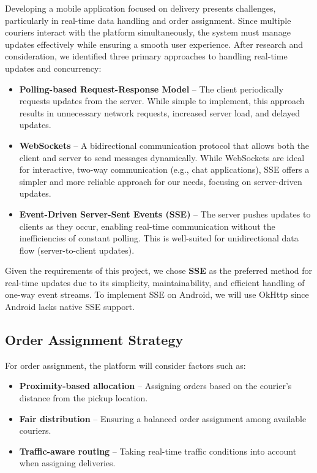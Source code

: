 Developing a mobile application focused on delivery presents challenges, particularly in real-time data handling and order assignment. Since multiple couriers interact with the platform simultaneously, the system must manage updates effectively while ensuring a smooth user experience. After research and consideration, we identified three primary approaches to handling real-time updates and concurrency:

\begin{itemize}
    \item \textbf{Polling-based Request-Response Model} – The client periodically requests updates from the server. While simple to implement, this approach results in unnecessary network requests, increased server load, and delayed updates.
    \item \textbf{WebSockets} – A bidirectional communication protocol that allows both the client and server to send messages dynamically. While WebSockets are ideal for interactive, two-way communication (e.g., chat applications), SSE offers a simpler and more reliable approach for our needs, focusing on server-driven updates.
    \item \textbf{Event-Driven Server-Sent Events (SSE)} – The server pushes updates to clients as they occur, enabling real-time communication without the inefficiencies of constant polling. This is well-suited for unidirectional data flow (server-to-client updates).
\end{itemize}

Given the requirements of this project, we chose \textbf{SSE} as the preferred method for real-time updates due to its simplicity, maintainability, and efficient handling of one-way event streams. To implement SSE on Android, we will use OkHttp since Android lacks native SSE support.

\subsection{Order Assignment Strategy}  

For order assignment, the platform will consider factors such as:

\begin{itemize}
    \item \textbf{Proximity-based allocation} – Assigning orders based on the courier’s distance from the pickup location.
    \item \textbf{Fair distribution} – Ensuring a balanced order assignment among available couriers.
    \item \textbf{Traffic-aware routing} – Taking real-time traffic conditions into account when assigning deliveries.
\end{itemize}

